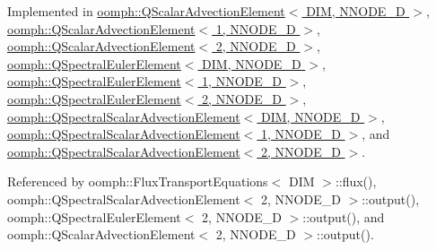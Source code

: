 Implemented in \hyperlink{classoomph_1_1QScalarAdvectionElement_aa7d957edda208be9ab56322dc735fda7}{oomph\+::\+Q\+Scalar\+Advection\+Element$<$ D\+I\+M, N\+N\+O\+D\+E\+\_\+D $>$}, \hyperlink{classoomph_1_1QScalarAdvectionElement_aa7d957edda208be9ab56322dc735fda7}{oomph\+::\+Q\+Scalar\+Advection\+Element$<$ 1, N\+N\+O\+D\+E\+\_\+D $>$}, \hyperlink{classoomph_1_1QScalarAdvectionElement_aa7d957edda208be9ab56322dc735fda7}{oomph\+::\+Q\+Scalar\+Advection\+Element$<$ 2, N\+N\+O\+D\+E\+\_\+D $>$}, \hyperlink{classoomph_1_1QSpectralEulerElement_a1aea03c046d9d1bec4717182386d7860}{oomph\+::\+Q\+Spectral\+Euler\+Element$<$ D\+I\+M, N\+N\+O\+D\+E\+\_\+D $>$}, \hyperlink{classoomph_1_1QSpectralEulerElement_a1aea03c046d9d1bec4717182386d7860}{oomph\+::\+Q\+Spectral\+Euler\+Element$<$ 1, N\+N\+O\+D\+E\+\_\+D $>$}, \hyperlink{classoomph_1_1QSpectralEulerElement_a1aea03c046d9d1bec4717182386d7860}{oomph\+::\+Q\+Spectral\+Euler\+Element$<$ 2, N\+N\+O\+D\+E\+\_\+D $>$}, \hyperlink{classoomph_1_1QSpectralScalarAdvectionElement_ad6e292ae057d0ed3f3e9990fa35f9bcc}{oomph\+::\+Q\+Spectral\+Scalar\+Advection\+Element$<$ D\+I\+M, N\+N\+O\+D\+E\+\_\+D $>$}, \hyperlink{classoomph_1_1QSpectralScalarAdvectionElement_ad6e292ae057d0ed3f3e9990fa35f9bcc}{oomph\+::\+Q\+Spectral\+Scalar\+Advection\+Element$<$ 1, N\+N\+O\+D\+E\+\_\+D $>$}, and \hyperlink{classoomph_1_1QSpectralScalarAdvectionElement_ad6e292ae057d0ed3f3e9990fa35f9bcc}{oomph\+::\+Q\+Spectral\+Scalar\+Advection\+Element$<$ 2, N\+N\+O\+D\+E\+\_\+D $>$}.



Referenced by oomph\+::\+Flux\+Transport\+Equations$<$ D\+I\+M $>$\+::flux(), oomph\+::\+Q\+Spectral\+Scalar\+Advection\+Element$<$ 2, N\+N\+O\+D\+E\+\_\+D $>$\+::output(), oomph\+::\+Q\+Spectral\+Euler\+Element$<$ 2, N\+N\+O\+D\+E\+\_\+D $>$\+::output(), and oomph\+::\+Q\+Scalar\+Advection\+Element$<$ 2, N\+N\+O\+D\+E\+\_\+D $>$\+::output().

\mbox{\label{classoomph_1_1FluxTransportEquations_a9bdf6ab17431bcac6eac11bce917cdde}} 
